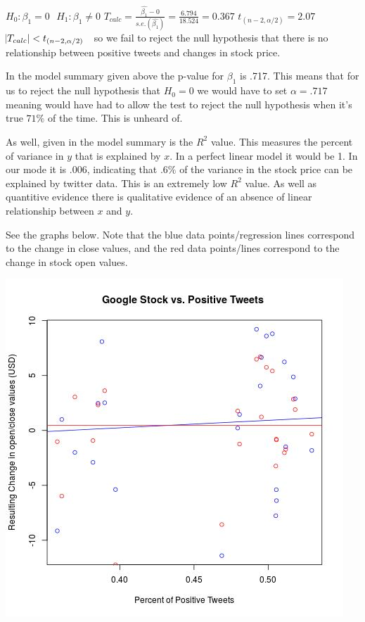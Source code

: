 \documentclass{acm_proc_article-sp}
\begin{document}
\indent $ H_0: \beta_1 = 0 \ \ \
H_1: \beta_1 \neq 0$ \newline\indent\large $T_{calc} = \frac{ \hat{\beta_1} - 0
}{s.e.(\hat{\beta_1})} = \frac{6.794}{18.524} = 0.367 $ \newline\indent $ t_{
(n-2,\alpha/2)} = 2.07$ \newline\indent $ \abs{T_{calc}} < t_{ (n-2,\alpha/2)}
\ \ $ \normalsize so we fail to reject the null hypothesis that there is no
relationship between positive tweets and changes in stock price.

\indent In the model summary given above the p-value for $\beta_1$ is
.717. This means that for us to reject the null hypothesis that $H_0 =0$ we
would have to set $\alpha = .717$ meaning would have had to allow the test to
reject the null hypothesis when it's true $71 \%$ of the time. This is unheard
of.

\indent As well, given in the model summary is the $R^2$ value.
This measures the percent of variance in $y$ that is explained by $x$. In a
perfect linear model it would be 1. In our mode it is $.006$, indicating that
$.6\%$ of the variance in the stock price can be explained by twitter data.
This is an extremely low $R^2$ value. As well as quantitive evidence there is
qualitative evidence of an absence of linear relationship between $x$ and $y$.

See the graphs below. Note that the blue data points/regression lines
correspond to the change in close values, and the red data points/lines
correspond to the change in stock open values.

\includegraphics[scale=.5]{google_positive.jpeg}
\end{document}
